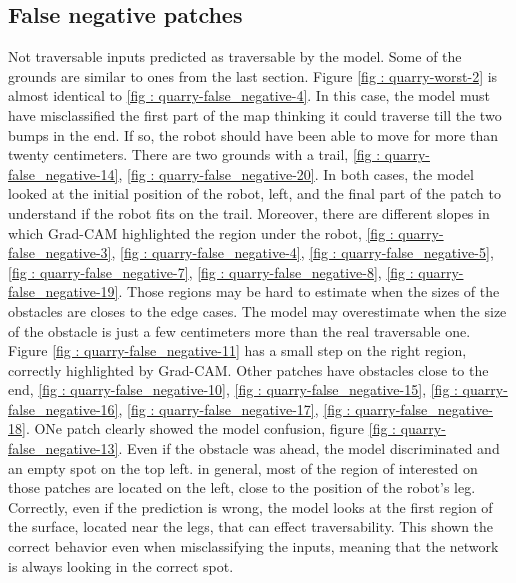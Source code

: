\documentclass[../document.tex]{subfiles}
\begin{document}
\subsection{False negative patches}
Not traversable inputs predicted as traversable by the model. Some of the grounds are similar to ones from the last section. Figure \ref{fig : quarry-worst-2} is almost identical to \ref{fig : quarry-false_negative-4}. In this case, the model must have misclassified the first part of the map thinking it could traverse till the two bumps in the end. If so, the robot should have been able to move for more than twenty centimeters. There are two grounds with a trail, \ref{fig : quarry-false_negative-14}, \ref{fig : quarry-false_negative-20}. In both cases, the model looked at the initial position of the robot, left, and the final part of the patch to understand if the robot fits on the trail. Moreover, there are different slopes in which Grad-CAM highlighted the region under the robot,  \ref{fig : quarry-false_negative-3},  \ref{fig : quarry-false_negative-4},  \ref{fig : quarry-false_negative-5},  \ref{fig : quarry-false_negative-7},  \ref{fig : quarry-false_negative-8},  \ref{fig : quarry-false_negative-19}. Those regions may be hard to estimate when the sizes of the obstacles are closes to the edge cases. The model may overestimate when the size of the obstacle is just a few centimeters more than the real traversable one. Figure \ref{fig : quarry-false_negative-11} has a small step on the right region, correctly highlighted by Grad-CAM. Other patches have obstacles close to the end, \ref{fig : quarry-false_negative-10}, \ref{fig : quarry-false_negative-15}, \ref{fig : quarry-false_negative-16}, \ref{fig : quarry-false_negative-17}, \ref{fig : quarry-false_negative-18}. ONe patch clearly showed the model confusion, figure \ref{fig : quarry-false_negative-13}. Even if the obstacle was ahead, the model discriminated and an empty spot on the top left. 
in general, most of the region of interested on those patches are located on the left, close to the position of the robot's leg. Correctly, even if the prediction is wrong, the model looks at the first region of the surface, located near the legs, that can effect traversability. This shown the correct behavior even when misclassifying the inputs, meaning that the network is always looking in the correct spot. 
\end{document}
